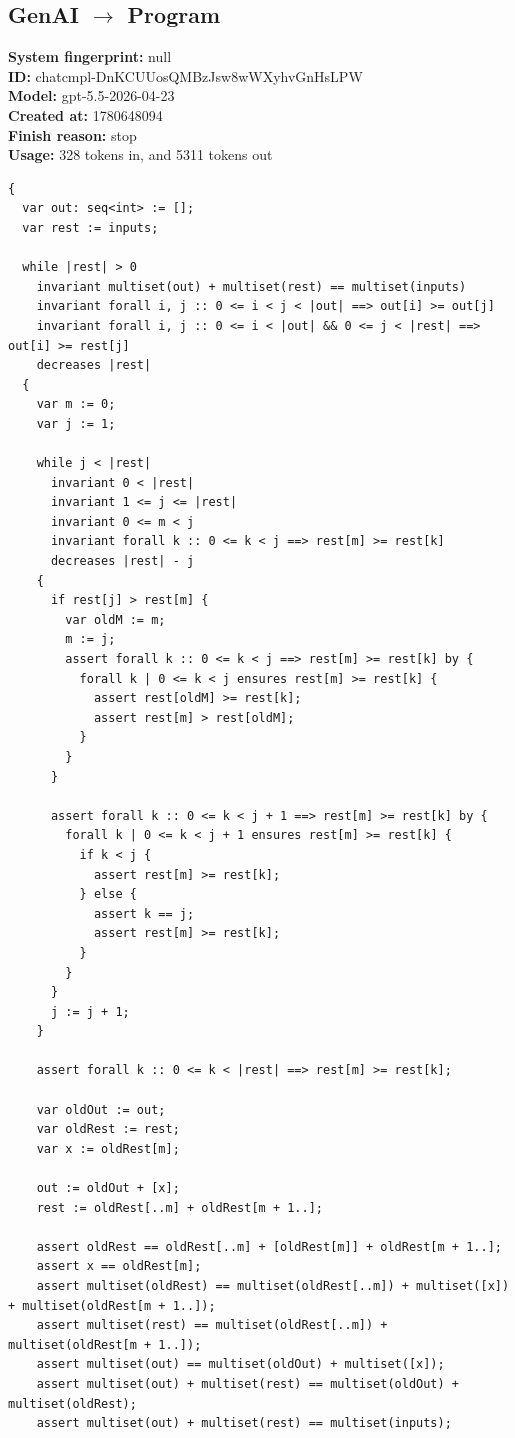 \documentclass{article}
\begin{document}
\subsection*{GenAI $\rightarrow$ Program}
\textbf{System fingerprint: }null
\\\textbf{ID: }chatcmpl-DnKCUUosQMBzJsw8wWXyhvGnHsLPW
\\\textbf{Model: }gpt-5.5-2026-04-23
\\\textbf{Created at: }1780648094
\\\textbf{Finish reason: }stop
\\\textbf{Usage: }328 tokens in, and 5311 tokens out
\begin{lstlisting}
{
  var out: seq<int> := [];
  var rest := inputs;

  while |rest| > 0
    invariant multiset(out) + multiset(rest) == multiset(inputs)
    invariant forall i, j :: 0 <= i < j < |out| ==> out[i] >= out[j]
    invariant forall i, j :: 0 <= i < |out| && 0 <= j < |rest| ==> out[i] >= rest[j]
    decreases |rest|
  {
    var m := 0;
    var j := 1;

    while j < |rest|
      invariant 0 < |rest|
      invariant 1 <= j <= |rest|
      invariant 0 <= m < j
      invariant forall k :: 0 <= k < j ==> rest[m] >= rest[k]
      decreases |rest| - j
    {
      if rest[j] > rest[m] {
        var oldM := m;
        m := j;
        assert forall k :: 0 <= k < j ==> rest[m] >= rest[k] by {
          forall k | 0 <= k < j ensures rest[m] >= rest[k] {
            assert rest[oldM] >= rest[k];
            assert rest[m] > rest[oldM];
          }
        }
      }

      assert forall k :: 0 <= k < j + 1 ==> rest[m] >= rest[k] by {
        forall k | 0 <= k < j + 1 ensures rest[m] >= rest[k] {
          if k < j {
            assert rest[m] >= rest[k];
          } else {
            assert k == j;
            assert rest[m] >= rest[k];
          }
        }
      }
      j := j + 1;
    }

    assert forall k :: 0 <= k < |rest| ==> rest[m] >= rest[k];

    var oldOut := out;
    var oldRest := rest;
    var x := oldRest[m];

    out := oldOut + [x];
    rest := oldRest[..m] + oldRest[m + 1..];

    assert oldRest == oldRest[..m] + [oldRest[m]] + oldRest[m + 1..];
    assert x == oldRest[m];
    assert multiset(oldRest) == multiset(oldRest[..m]) + multiset([x]) + multiset(oldRest[m + 1..]);
    assert multiset(rest) == multiset(oldRest[..m]) + multiset(oldRest[m + 1..]);
    assert multiset(out) == multiset(oldOut) + multiset([x]);
    assert multiset(out) + multiset(rest) == multiset(oldOut) + multiset(oldRest);
    assert multiset(out) + multiset(rest) == multiset(inputs);


\end{lstlisting}
\end{document}
